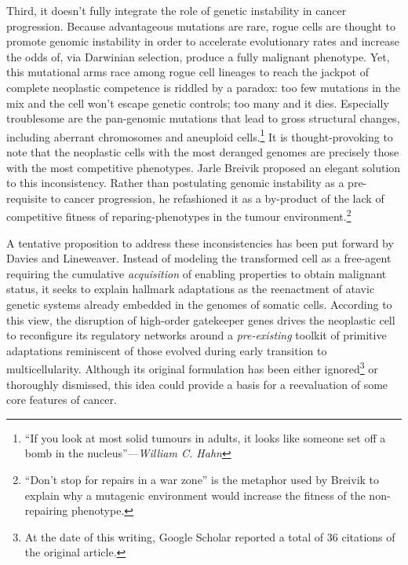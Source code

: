 Third, it doesn't fully integrate the role of genetic instability in cancer
progression.  Because advantageous mutations are rare, rogue cells are thought
to promote genomic instability in order to accelerate evolutionary rates and
increase the odds of, via Darwinian selection, produce a fully malignant
phenotype.\cite{sieber_genomic_2003} Yet, this mutational arms race among rogue
cell lineages to reach the jackpot of complete neoplastic competence is riddled
by a paradox: too few mutations in the mix and the cell won't escape genetic
controls; too many and it dies.  Especially troublesome are the
\mbox{pan-genomic} mutations that lead to gross structural changes, including
aberrant chromosomes and aneuploid cells.\footnote{``If you look at most solid
  tumours in adults, it looks like someone set off a bomb in the
  nucleus''---\emph{William C. Hahn}} It is thought-provoking to note that
the neoplastic cells with the most deranged genomes are precisely those with the
most competitive phenotypes.  Jarle Breivik proposed an elegant solution to this
inconsistency.\cite{breivik_evolutionary_2005} Rather than postulating genomic
instability as a pre-requisite to cancer progression, he refashioned it as a
\mbox{by-product} of the lack of competitive fitness of reparing-phenotypes in
the tumour environment.\footnote{``Don't stop for repairs in a war zone'' is the
  metaphor used by Breivik to explain why a mutagenic environment would increase
  the fitness of the non-repairing phenotype.  %
}

A tentative proposition to address these inconsistencies has been put forward by
Davies and Lineweaver.\cite{davies_cancer_2011} Instead of modeling the
transformed cell as a free-agent requiring the cumulative \emph{acquisition} of
enabling properties to obtain malignant status, it seeks to explain hallmark
adaptations as the reenactment of atavic genetic systems already embedded in the
genomes of somatic cells.  According to this view, the disruption of high-order
gatekeeper genes drives the neoplastic cell to reconfigure its regulatory
networks around a \emph{pre-existing} toolkit of primitive adaptations
reminiscent of those evolved during early transition to multicellularity.
Although its original formulation has been either ignored\footnote{At the date
  of this writing, Google Scholar reported a total of 36 citations of the
  original article.} or thoroughly
dismissed,\cite{pettit_cancer_2012,myers_aaargh!_2012} this idea could provide a
basis for a reevaluation of some core features of cancer.

